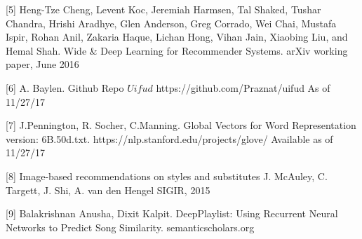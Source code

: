\documentclass[10pt,twocolumn,letterpaper]{article}
\begin{document}
[5] Heng-Tze Cheng, Levent Koc, Jeremiah Harmsen, Tal Shaked, Tushar Chandra, Hrishi Aradhye, Glen Anderson, Greg Corrado, Wei Chai, Mustafa Ispir, Rohan Anil, Zakaria Haque, Lichan Hong, Vihan Jain, Xiaobing Liu, and Hemal Shah.
Wide \& Deep Learning for Recommender Systems. arXiv working paper, June 2016

[6] A. Baylen. Github Repo $Uifud$
https://github.com/Praznat/uifud
As of 11/27/17 

[7] J.Pennington, R. Socher, C.Manning. Global Vectors for Word Representation 
version: 6B.50d.txt. https://nlp.stanford.edu/projects/glove/ 
Available as of 11/27/17 

[8] Image-based recommendations on styles and substitutes
J. McAuley, C. Targett, J. Shi, A. van den Hengel
SIGIR, 2015

[9] Balakrishnan Anusha, Dixit Kalpit. DeepPlaylist: Using Recurrent Neural Networks to
Predict Song Similarity. semanticscholars.org 
\end{document}

